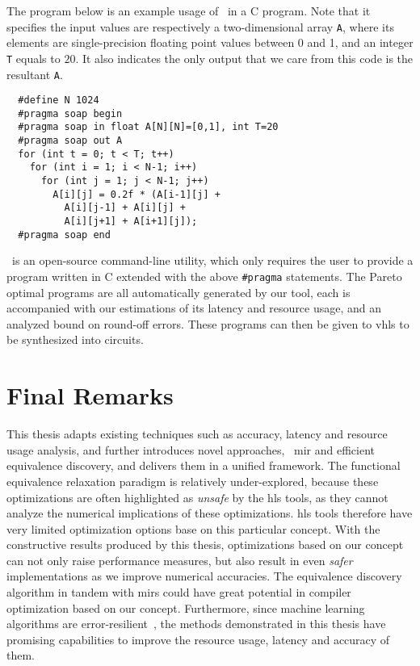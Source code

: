 The program below is an example usage of \soap~in a C program.  Note that it
specifies the input values are respectively a two-dimensional array \verb|A|,
where its elements are single-precision floating point values between 0 and 1,
and an integer \verb|T| equals to $20$.  It also indicates the only output that
we care from this code is the resultant \verb|A|.
\begin{lstlisting}
  #define N 1024
  #pragma soap begin
  #pragma soap in float A[N][N]=[0,1], int T=20
  #pragma soap out A
  for (int t = 0; t < T; t++)
    for (int i = 1; i < N-1; i++)
      for (int j = 1; j < N-1; j++)
        A[i][j] = 0.2f * (A[i-1][j] +
          A[i][j-1] + A[i][j] +
          A[i][j+1] + A[i+1][j]);
  #pragma soap end
\end{lstlisting}

\soap~is an open-source command-line utility, which only requires the user
to provide a program written in C extended with the above \verb|#pragma|
statements.  The Pareto optimal programs are all automatically generated by
our tool, each is accompanied with our estimations of its latency and resource
usage, and an analyzed bound on round-off errors.  These programs can then be
given to \gls{vhls} to be synthesized into circuits.


\section{Final Remarks}
\label{cc:sec:final_remarks}

This thesis adapts existing techniques such as accuracy, latency and resource
usage analysis, and further introduces novel approaches, \eg~\gls{mir} and
efficient equivalence discovery, and delivers them in a unified framework.
The functional equivalence relaxation paradigm is relatively under-explored,
because these optimizations are often highlighted as \emph{unsafe} by the
\gls{hls} tools, as they cannot analyze the numerical implications of these
optimizations.  \Gls{hls} tools therefore have very limited optimization
options base on this particular concept.  With the constructive results
produced by this thesis, optimizations based on our concept can not only raise
performance measures, but also result in even \emph{safer} implementations
as we improve numerical accuracies.  The equivalence discovery algorithm in
tandem with \glspl{mir} could have great potential in compiler optimization
based on our concept.  Furthermore, since machine learning algorithms are
error-resilient~\cite{lesser11, kim09, holt91, zhu03}, the methods demonstrated
in this thesis have promising capabilities to improve the resource usage,
latency and accuracy of them.
